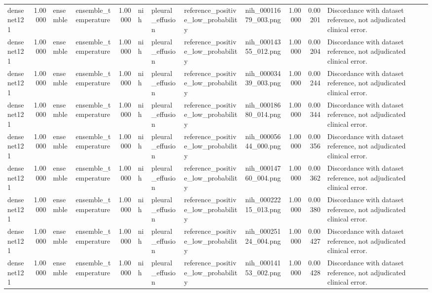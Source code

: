 \begin{tabular}{lrllrllllrrl}
densenet121 & 1.00000 & ensemble & ensemble\_temperature & 1.00000 & nih & pleural\_effusion & reference\_positive\_low\_probability & nih\_00011679\_003.png & 1.00000 & 0.00201 & Discordance with dataset reference, not adjudicated clinical error. \\
densenet121 & 1.00000 & ensemble & ensemble\_temperature & 1.00000 & nih & pleural\_effusion & reference\_positive\_low\_probability & nih\_00014355\_012.png & 1.00000 & 0.00204 & Discordance with dataset reference, not adjudicated clinical error. \\
densenet121 & 1.00000 & ensemble & ensemble\_temperature & 1.00000 & nih & pleural\_effusion & reference\_positive\_low\_probability & nih\_00003439\_003.png & 1.00000 & 0.00244 & Discordance with dataset reference, not adjudicated clinical error. \\
densenet121 & 1.00000 & ensemble & ensemble\_temperature & 1.00000 & nih & pleural\_effusion & reference\_positive\_low\_probability & nih\_00018680\_014.png & 1.00000 & 0.00344 & Discordance with dataset reference, not adjudicated clinical error. \\
densenet121 & 1.00000 & ensemble & ensemble\_temperature & 1.00000 & nih & pleural\_effusion & reference\_positive\_low\_probability & nih\_00005644\_000.png & 1.00000 & 0.00356 & Discordance with dataset reference, not adjudicated clinical error. \\
densenet121 & 1.00000 & ensemble & ensemble\_temperature & 1.00000 & nih & pleural\_effusion & reference\_positive\_low\_probability & nih\_00014760\_004.png & 1.00000 & 0.00362 & Discordance with dataset reference, not adjudicated clinical error. \\
densenet121 & 1.00000 & ensemble & ensemble\_temperature & 1.00000 & nih & pleural\_effusion & reference\_positive\_low\_probability & nih\_00022215\_013.png & 1.00000 & 0.00380 & Discordance with dataset reference, not adjudicated clinical error. \\
densenet121 & 1.00000 & ensemble & ensemble\_temperature & 1.00000 & nih & pleural\_effusion & reference\_positive\_low\_probability & nih\_00025124\_004.png & 1.00000 & 0.00427 & Discordance with dataset reference, not adjudicated clinical error. \\
densenet121 & 1.00000 & ensemble & ensemble\_temperature & 1.00000 & nih & pleural\_effusion & reference\_positive\_low\_probability & nih\_00014153\_002.png & 1.00000 & 0.00428 & Discordance with dataset reference, not adjudicated clinical error. \\

\end{tabular}
